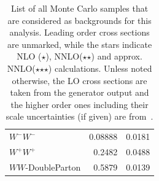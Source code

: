 \begin{table}[htbp!]
\begin{tabular}{|l|r|r|}
\hline
$W^-W^-$ & 0.08888 & 0.0181 \\
$W^+W^+$ & 0.2482 & 0.0488 \\
$WW$-DoubleParton & 0.5879 & 0.0139 \\
\hline
  \end{tabular}
  \caption{List of all Monte Carlo samples that are considered as backgrounds for this analysis. Leading order cross sections are unmarked, while the stars indicate NLO ($\star$), NNLO($\star$$\star$) and approx. NNLO($\star$$\star$$\star$) calculations. Unless noted otherwise, the LO cross sections are taken from the generator output and the higher order ones including their scale uncertainties (if given) are from~\cite{xsec}.}
  \label{tab:mcsamples}
\end{table}

